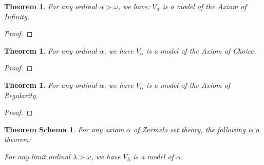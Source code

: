 \documentclass{book}
\let\qed\relax
\newtheorem{thm}[ax]{Theorem}
\newtheorem{thms}[ax]{Theorem Schema}
\theoremstyle{definition}
\begin{document}
\begin{thm}
\label{thm:modelInfinity}
For any ordinal $\alpha > \omega$, we have: $V_\alpha$ is a model of the Axiom of Infinity.
\end{thm}

\begin{proof}
\pf
{}
\qed
\end{proof}

\begin{thm}
\label{thm:modelChoice}
For any ordinal $\alpha$, we have $V_\alpha$ is a model of the Axiom of Choice.
\end{thm}

\begin{proof}
\pf
{}
\qed
\end{proof}

\begin{thm}
\label{thm:modelRegularity}
For any ordinal $\alpha$, we have $V_\alpha$ is a model of the Axiom of Regularity.
\end{thm}

\begin{proof}
\pf
{}
\qed
\end{proof}

\begin{thms}
For any axiom $\alpha$ of Zermelo set theory, the following is a theorem:

For any limit ordinal $\lambda > \omega$, we have $V_\lambda$ is a model of $\alpha$.
\end{thms}
\end{document}
